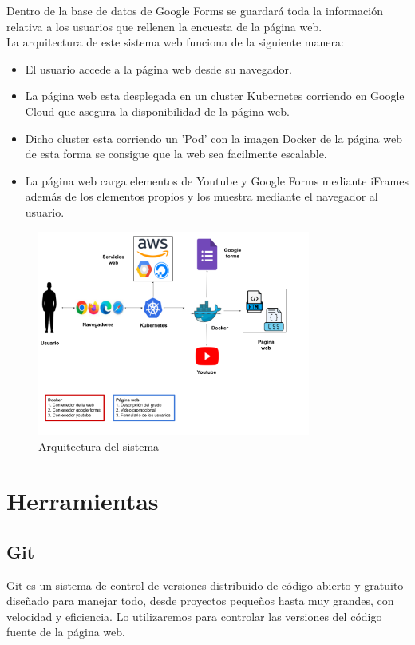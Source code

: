 \documentclass{report}
\begin{document}
        Dentro de la base de datos de Google Forms se guardará toda la información relativa a los usuarios que rellenen la encuesta de la página web.\\
        \clearpage
        La arquitectura de este sistema web funciona de la siguiente manera:
        \begin{itemize}
            \item El usuario accede a la página web desde su navegador.
            \item La página web esta desplegada en un cluster Kubernetes corriendo en Google Cloud que asegura la disponibilidad de la página web.
            \item Dicho cluster esta corriendo un 'Pod' con la imagen Docker de la página web de esta forma se consigue que la web sea facilmente escalable.
            \item La página web carga elementos de Youtube y Google Forms mediante iFrames además de los elementos propios y los muestra mediante el navegador al usuario.
        \end{itemize}
        \begin{figure}[H]
            \centering
            \includegraphics[width=0.8\textwidth]{./img/arquitectura.png}
            \caption{Arquitectura del sistema}
        \end{figure}
    \chapter{Herramientas}
        \section*{Git}
            Git es un sistema de control de versiones distribuido de código abierto y gratuito diseñado para manejar todo, desde proyectos pequeños hasta muy grandes, con velocidad y eficiencia. Lo utilizaremos para controlar las versiones del código fuente de la página web.
\end{document}
